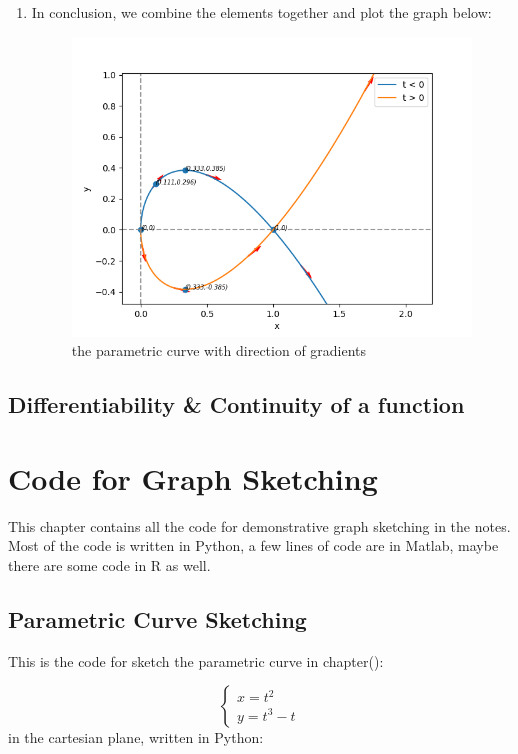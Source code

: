 \documentclass[12pt]{report}
\begin{document}
\begin{enumerate}
    \item In conclusion, we combine the elements together and plot the graph below:
    \begin{figure}[h]
        \centering
        \includegraphics[scale = 0.6]{parametric-curve-sketching.png}
        \caption{the parametric curve with direction of gradients}    
    \end{figure}
\end{enumerate}
    


\section{Differentiability \& Continuity of a function}


\appendix

\chapter{Code for Graph Sketching}
This chapter contains all the code for demonstrative graph sketching in the notes.
Most of the code is written in Python, a few lines of code are in Matlab, maybe there are some code in R as well.
\section{Parametric Curve Sketching}
This is the code for sketch the parametric curve in chapter():

$$
\left\{\begin{array}{ll}
x = t^2 
\\ y = t^3 - t
\end{array}\right.
$$ in the cartesian plane, written in Python:
\end{document}
